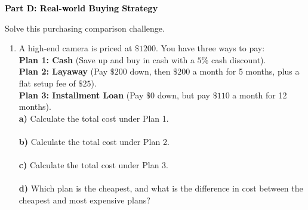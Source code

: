 \documentclass[12pt, letterpaper, fleqn]{article}
\newcommand{\blanklong}{\underline{\hspace{6.5cm}}}
\begin{document}
\newpage

\begin{tcolorbox}[colback=black!10]
    \large\textcolor{black}{\textbf{Part D: Real-world Buying Strategy}}
\end{tcolorbox}

\vspace{3mm}

\noindent
Solve this purchasing comparison challenge.

\vspace{5mm}

\begin{enumerate}[itemsep=2.5cm, leftmargin=0.6cm]
\item A high-end camera is priced at $\$1200$. You have three ways to pay: \\
\textbf{Plan 1: Cash} (Save up and buy in cash with a $5\%$ cash discount). \\
\textbf{Plan 2: Layaway} (Pay $\$200$ down, then $\$200$ a month for 5 months, plus a flat setup fee of $\$25$). \\
\textbf{Plan 3: Installment Loan} (Pay $\$0$ down, but pay $\$110$ a month for 12 months). \\
\textbf{a)} Calculate the total cost under Plan 1. \\
\blanklong \\
\textbf{b)} Calculate the total cost under Plan 2. \\
\blanklong \\
\textbf{c)} Calculate the total cost under Plan 3. \\
\blanklong \\
\textbf{d)} Which plan is the cheapest, and what is the difference in cost between the cheapest and most expensive plans? \\
\blanklong
\end{enumerate}
\end{document}
